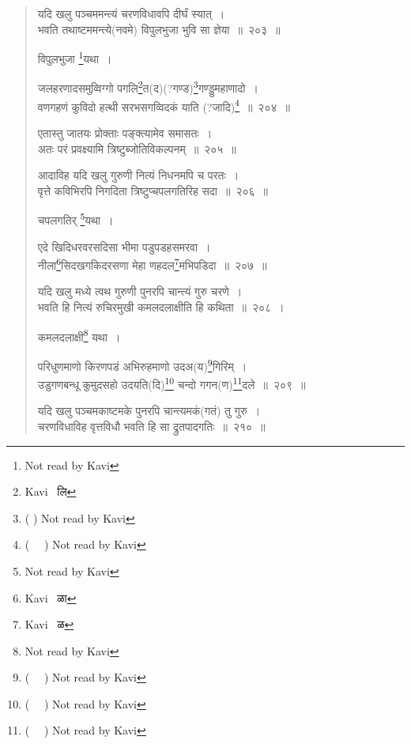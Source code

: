 \documentclass[11pt, openany]{book}
\begin{document}
\begin{quote}
{\na यदि खलु पञ्चममन्त्यं चरणविधावपि दीर्घं स्यात्~। \\
भवति तथाष्टममन्त्ये(नवमे) विपुलभुजा भुवि सा ज्ञेया~॥~२०३~॥}

विपुलभुजा \renewcommand{\thefootnote}{1}\footnote{Not read by Kavi}यथा~।

{\na जलहरणादसमुव्विग्गो पगलि\renewcommand{\thefootnote}{2}\footnote{Kavi \textendash\ लि}त(द)(?गण्ड)\renewcommand{\thefootnote}{3}\footnote{( \textendash \textendash\textendash ) Not read by Kavi}गण्ड्डुमहाणादो~।\\
वणगहणं कुविदो हत्थी सरभसगव्विदकं याति (?जादि)\renewcommand{\thefootnote}{4}\footnote{ ( \textendash\ \textendash\ \textendash ) Not read by Kavi}~॥~२०४~॥}

{ }

{\na एतास्तु जातयः प्रोक्ताः पङ्क्त्यामेव समासतः~। \\
अतः परं प्रवक्ष्यामि त्रिष्टुब्जोतिविकल्पनम्~॥~२०५~॥

आदाविह यदि खलु गुरुणी नित्यं निधनमपि च परतः~।\\
वृत्ते कविभिरपि निगदिता त्रिष्टुप्चपलगतिरिह सदा~॥~२०६~॥}

चपलगतिर् \renewcommand{\thefootnote}{5}\footnote{Not read by Kavi}यथा~।

{\na एदे खिदिधरवरसदिसा भीमा पडुपडहसमरवा~।\\
नीला\renewcommand{\thefootnote}{6}\footnote{Kavi \textendash\ ळा}सिदखगकिदरसणा मेहा णहदल\renewcommand{\thefootnote}{7}\footnote{Kavi \textendash\ ळ}मभिपडिदा~॥~२०७~॥}

{ }

{\na यदि खलु मध्ये त्वथ गुरुणी पुनरपि चान्त्यं गुरु चरणे~। \\
भवति हि नित्यं रुचिरमुखी कमलदलाक्षीति हि कथिता~॥~२०८~।}

कमलदलाक्षी\renewcommand{\thefootnote}{8}\footnote{Not read by Kavi} यथा~।

{\na परिधुणमाणो किरणपडं अभिरुहमाणो उदअ(य)\renewcommand{\thefootnote}{9}\footnote{( \textendash\ \textendash\ \textendash ) Not read by Kavi}गिरिम्~।\\
उडुगणबन्धू कुमुदसहो उदयति(दि)\renewcommand{\thefootnote}{10}\footnote{( \textendash\ \textendash\ \textendash ) Not read by Kavi} चन्दो गगन(ण)\renewcommand{\thefootnote}{11}\footnote{( \textendash\ \textendash\ \textendash ) Not read by Kavi}दले~॥~२०९~॥}

{ }

{\na यदि खलु पञ्चमकाष्टमके पुनरपि चान्त्यमकं(गतं) तु गुरु~। \\
चरणविधाविह वृत्तविधौ भवति हि सा द्रुतपादगतिः~॥~२१०~॥}
\end{quote}
\end{document}
